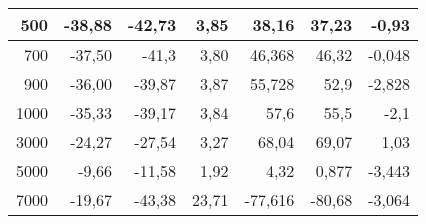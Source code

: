 \documentclass{article}
\begin{document}
\begin{table}[h!]
\begin{tabular}{|r|r|r|r|r|r|r|}
500                                  & -38,88                                              & -42,73                             & 3,85                                     & 38,16                            & 37,23                                    & -0,93                                                                                       \\ \hline
700                                  & -37,50                                              & -41,3                              & 3,80                                     & 46,368                           & 46,32                                    & -0,048                                                                                      \\ \hline
900                                  & -36,00                                              & -39,87                             & 3,87                                     & 55,728                           & 52,9                                     & -2,828                                                                                      \\ \hline
1000                                 & -35,33                                              & -39,17                             & 3,84                                     & 57,6                             & 55,5                                     & -2,1                                                                                        \\ \hline
3000                                 & -24,27                                              & -27,54                             & 3,27                                     & 68,04                            & 69,07                                    & 1,03                                                                                        \\ \hline
5000                                 & -9,66                                               & -11,58                             & 1,92                                     & 4,32                             & 0,877                                    & -3,443                                                                                      \\ \hline
7000                                 & -19,67                                              & -43,38                             & 23,71                                    & -77,616                          & -80,68                                   & -3,064                                                                                      \\ \hline

\end{tabular}
\end{table}
\end{document}
